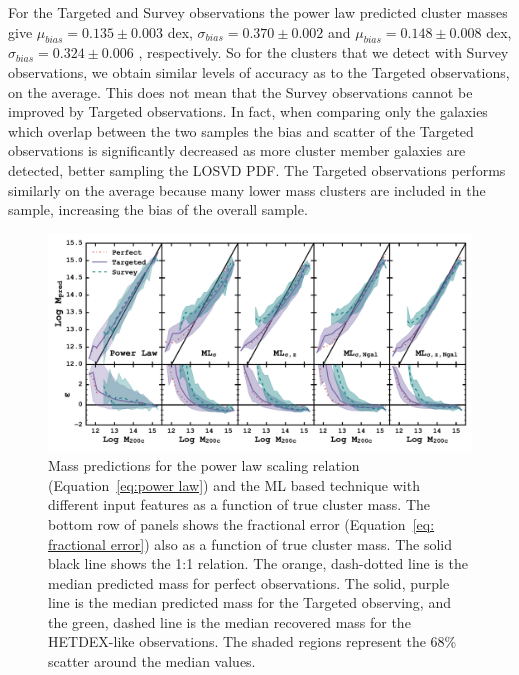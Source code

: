 For the Targeted and Survey observations the power law predicted cluster masses give $\mu_{bias} =0.135\pm{0.003}$ dex, $\sigma_{bias} = 0.370\pm{0.002}$ and $\mu_{bias} =0.148\pm{0.008}$ dex, $\sigma_{bias} = 0.324\pm{0.006}$ , respectively. So for the clusters that we detect with Survey observations, we obtain similar levels of accuracy as to the Targeted observations, on the average. This does not mean that the Survey observations cannot be improved by Targeted observations. In fact, when comparing only the galaxies which overlap between the two samples the bias and scatter of the Targeted observations is significantly decreased as more cluster member galaxies are detected, better sampling the LOSVD PDF. The Targeted observations performs similarly on the average because many lower mass clusters are included in the sample, increasing the bias of the overall sample.

\begin{figure}[t]
	\begin{center}
		\includegraphics[width=\textwidth]{figures1/MLcomparison.pdf}
	\end{center}
	\caption[ML based cluster mass predictions]{Mass predictions for the power law scaling relation (Equation~\ref{eq:power law}) and the ML based technique with different input features as a function of true cluster mass. The bottom row of panels shows the fractional error (Equation~\ref{eq: fractional error}) also as a function of true cluster mass. The solid black line shows the 1:1 relation. The orange, dash-dotted line is the median predicted mass for perfect observations. The solid, purple line is the median predicted mass for the Targeted observing, and the green, dashed line is the median recovered mass for the HETDEX-like observations. The shaded regions represent the 68\% scatter around the median values.}
	\label{fig: ML comparison} 
\end{figure}

